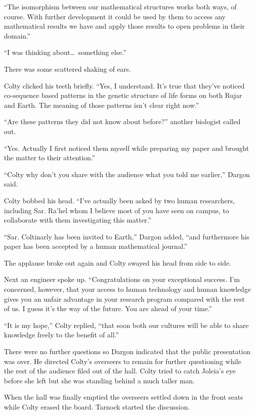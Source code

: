 ``The isomorphism between our mathematical structures works both ways, of course. With further
development it could be used by them to access any mathematical results we have and apply those
results to open problems in their domain.''

``I was thinking about\ldots\ something else.''

There was some scattered shaking of ears.

Colty clicked his teeth briefly. ``Yes, I understand. It's true that they've noticed co-sequence
based patterns in the genetic structure of life forms on both Rujar and Earth. The meaning of
those patterns isn't clear right now.''

``Are these patterns they did not know about before?'' another biologist called out.

``Yes. Actually I first noticed them myself while preparing my paper and brought the matter to
their attention.''

``Colty why don't you share with the audience what you told me earlier,'' Dargon said.

Colty bobbed his head. ``I've actually been asked by two human researchers, including Sar.
Ra'hel whom I believe most of you have seen on campus, to collaborate with them investigating
this matter.''

``Sar. Coltinarly has been invited to Earth,'' Dargon added, ``and furthermore his paper has
been accepted by a human mathematical journal.''

The applause broke out again and Colty swayed his head from side to side.

Next an engineer spoke up. ``Congratulations on your exceptional success. I'm concerned,
however, that your access to human technology and human knowledge gives you an unfair advantage
in your research program compared with the rest of us. I guess it's the way of the future. You
are ahead of your time.''

``It is my hope,'' Colty replied, ``that soon both our cultures will be able to share knowledge
freely to the benefit of all.''

There were no further questions so Dargon indicated that the public presentation was over. He
directed Colty's overseers to remain for further questioning while the rest of the audience
filed out of the hall. Colty tried to catch Joleia's eye before she left but she was standing
behind a much taller man.

When the hall was finally emptied the overseers settled down in the front seats while Colty
erased the board. Tarnock started the discussion.

